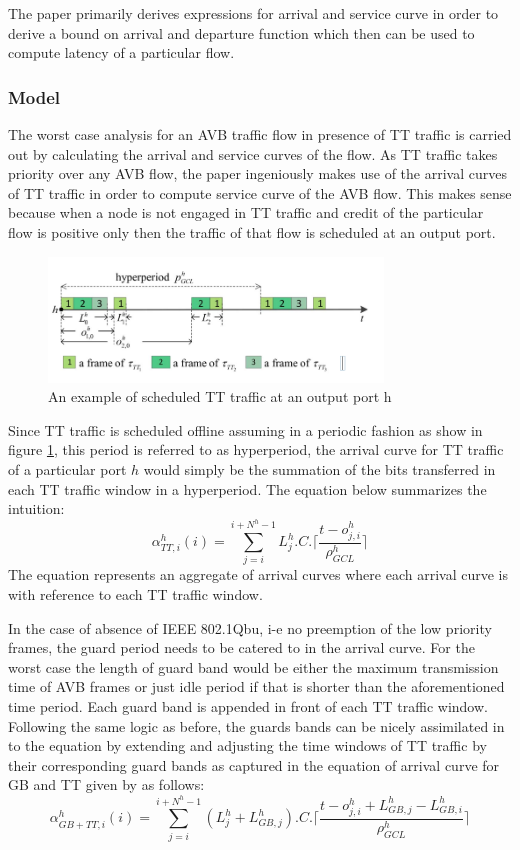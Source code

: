 \documentclass[journal,12pt,twocolumn]{IEEEtran}
\begin{document}
The paper primarily derives expressions for arrival and service curve in order to derive a bound on arrival and departure function which then can be used to compute latency of a particular 
flow.
\subsubsection {Model}
The worst case analysis for an AVB traffic flow in presence of TT traffic is carried out by calculating the arrival and service curves of the flow. As TT traffic takes priority over any AVB flow, the paper ingeniously makes use of the arrival curves of TT traffic in order to compute service curve of the AVB flow. This makes sense because when a node is not engaged in TT traffic and credit of the particular flow is positive only then the traffic of that flow is scheduled at an output port.
\begin{figure}
\centering
\includegraphics[width=3.5in]{NC_TT}
\caption{An example of scheduled TT traffic at an output port h }
\label{NC_TT}
\end{figure}
Since TT traffic is scheduled offline assuming in a periodic fashion as show in figure \ref{NC_TT}, this period is referred to as hyperperiod, the arrival curve for TT traffic of a particular port $h$ would simply be the summation of the bits transferred in each TT traffic window in a hyperperiod. The equation below summarizes the intuition:
\begin{equation}
\label{ttalpha}
\alpha^h_{TT,i}(i)=\sum_{j=i}^{i+N^h-1} L_j^h.C.\Bigg \lceil \frac{t-o_{j,i}^h}{\rho_{GCL}^h}\Bigg \rceil
\end{equation}
The equation represents an aggregate of arrival curves where each arrival curve is with reference to each TT traffic window.

In the case of absence of IEEE  802.1Qbu, i-e no preemption of the low priority frames, the guard period needs to be catered to in the arrival curve. For the worst case the length of guard band would be either the maximum transmission time of AVB frames or just idle period if that is shorter than the aforementioned time period. Each guard band is appended in front of each TT traffic window. Following the same logic as before, the guards bands can be nicely assimilated in to the equation by extending and adjusting the time windows of TT traffic by their corresponding guard bands as captured in the equation of arrival curve for GB and TT given by as follows:
\begingroup\makeatletter\def\f@size{8}\check@mathfonts
$$\alpha^h_{GB + TT,i}(i)=\sum_{j=i}^{i+N^h-1} (L_j^h+L_{GB,j}^h).C.\Bigg \lceil \frac{t-o_{j,i}^h+L_{GB,j}^h-L_{GB,i}^h}{\rho_{GCL}^h}\Bigg \rceil$$\endgroup
\end{document}
